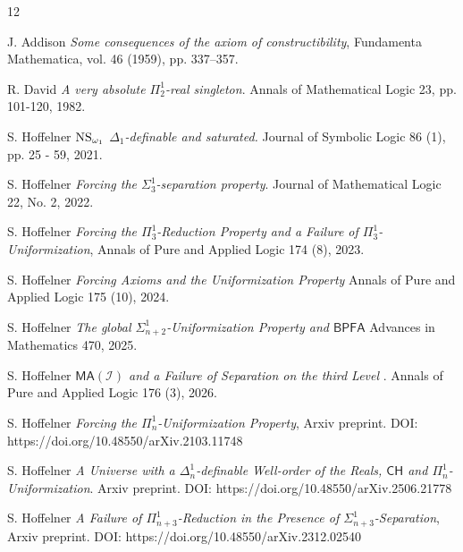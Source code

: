\documentclass[a4paper,11pt]{article}
\newcommand{\BPFA}{\mathsf{BPFA}}
\begin{document}
    
    \begin{thebibliography}{12}
    
    
     J. Addison \textit{Some consequences of the axiom of constructibility}, Fundamenta Mathematica, vol. 46 (1959), pp. 337–357.
    
    
    
    
    R. David \textit{A very absolute $\Pi^1_2$-real singleton}. Annals of Mathematical Logic 23, pp. 101-120, 1982.
    
     S. Hoffelner \textit{$\hbox{NS}_{\omega_1}$ $\Delta_1$-definable and saturated.}  Journal of Symbolic Logic 86 (1), pp. 25 - 59, 2021.
   
  
     S. Hoffelner \textit{Forcing the $\Sigma^1_3$-separation property}. Journal of Mathematical Logic 22, No. 2, 2022.
    

      S. Hoffelner \textit{Forcing the $\Pi^1_3$-Reduction Property and a Failure of $\Pi^1_3$-Uniformization},  Annals of Pure and Applied Logic 174 (8), 2023.
      
     S. Hoffelner \textit{Forcing Axioms and the Uniformization Property} Annals of Pure and Applied Logic 175 (10), 2024.
    
    
      S. Hoffelner \textit{The global $\Sigma^1_{n+2}$-Uniformization Property and $\BPFA$} Advances in Mathematics 470, 2025.

      S. Hoffelner \textit{$\mathsf{MA} (\mathcal{I})$ and a Failure of Separation on the third Level }. Annals of Pure and Applied Logic 176 (3), 2026.

 
     S. Hoffelner \textit{Forcing the $\Pi^1_n$-Uniformization Property}, Arxiv preprint. DOI: https://doi.org/10.48550/arXiv.2103.11748
    
    
    S. Hoffelner \textit{A Universe with a $\Delta^1_n$-definable Well-order of the Reals, $\mathsf{CH}$ and $\Pi^1_n$-Uniformization}. Arxiv preprint. DOI: https://doi.org/10.48550/arXiv.2506.21778
    
    
     S. Hoffelner \textit{A Failure of $\Pi^1_{n+3}$-Reduction in the Presence of $\Sigma^1_{n+3}$-Separation}, Arxiv preprint. DOI: https://doi.org/10.48550/arXiv.2312.02540


\end{thebibliography}
\end{document}
